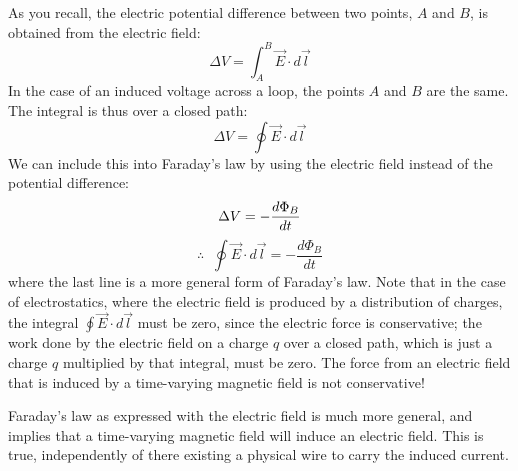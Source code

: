 As you recall, the electric potential difference between two points, $A$ and $B$, is obtained from the electric field:
\begin{equation}
\Delta V = \int_A^B \vec E\cdot d\vec l
\end{equation}
In the case of an induced voltage across a loop, the points $A$ and $B$ are the same. The integral is thus over a closed path:
\begin{equation}
\Delta V = \oint \vec E\cdot d\vec l
\end{equation}
We can include this into Faraday's law by using the electric field instead of the potential difference:
\begin{equation}
\Delta V =-\frac{d\Phi_B}{dt}\\
\end{equation}
\begin{equation}
\therefore \;\;\boxed{\oint \vec E\cdot d\vec l = -\frac{d\Phi_B}{dt}}
\end{equation}
where the last line is a more general form of Faraday's law. Note that in the case of electrostatics, where the electric field is produced by a distribution of charges, the integral $\oint \vec E\cdot d\vec l$ must be zero, since the electric force is conservative; the work done by the electric field on a charge $q$ over a closed path, which is just a charge $q$ multiplied by that integral, must be zero. The force from an electric field that is induced by a time-varying magnetic field is not conservative!

Faraday's law as expressed with the electric field is much more general, and implies that a time-varying magnetic field will induce an electric field. This is true, independently of there existing a physical wire to carry the induced current.

